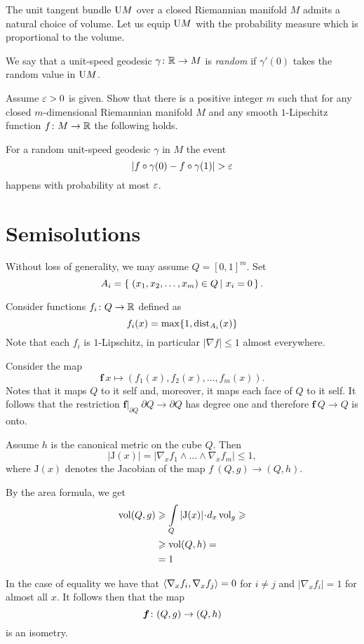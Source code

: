 The unit tangent bundle $\mathrm{U} M$ over a closed Riemannian manifold $M$
admits a natural choice of volume.
Let us equip $\mathrm{U} M$ with the probability measure which is proportional to the volume.

We say that a unit-speed geodesic $\gamma\colon\mathbb{R}\to M$ is \emph{random}
if $\gamma'(0)$ takes the random value in $\mathrm{U} M$.

\begin{pr}
Assume $\varepsilon>0$ is given.
Show that there is a positive integer $m$ such that
for any closed $m$-dimensional Riemannian manifold $M$
and any smooth $1$-Lipschitz function $f\colon M\to\mathbb{R}$ the following holds.

For a random unit-speed geodesic $\gamma$ in $M$ 
the event 
\[|f\circ\gamma(0)-f\circ\gamma(1)|>\eps\]
happens with probability at most $\varepsilon$.
\end{pr}



\section*{Semisolutions}

Without loss of generality, we may assume  $Q=[0,1]^m$.
Set 
\[A_i=\set{(x_1,x_2,\dots,x_m)\in Q}{x_i=0}.\]

Consider functions $f_i\colon Q\to\mathbb{R}$ defined as
$$f_i(x)=\max\{1,\operatorname{\rm dist}\nolimits_{A_i}(x)\}$$
Note that each $f_i$ is $1$-Lipschitz, 
in particular $|\nabla f|\le 1$ almost everywhere.

Consider the map
\[\bm{f}\:x\mapsto(f_1(x),f_2(x),\dots,f_m(x)).\]
Notes that it maps $Q$ to it self
and, moreover, it maps each face of $Q$ to it self.
It follows that the restriction $\bm{f}|_{\partial Q}\:\partial Q\to \partial Q$ has degree one and therefore 
$\bm{f}\:Q\to Q$ is onto.

Assume $h$ is the canonical metric on the cube $Q$.
Then 
\[|\mathrm{J}(x)|=|\nabla_x f_1\wedge\dots\wedge\nabla_xf_m|\le 1,\]
where $\mathrm{J}(x)$ denotes the Jacobian of the map $f\:(Q,g)\to (Q,h)$.

By the area formula, we get 
\begin{align*}
\vol(Q,g)
&\ge \int\limits_Q|\mathrm{J}(x)|\cdot d_x\vol_g\ge
\\
&\ge\vol(Q,h)=\\
&=1
\end{align*}

In the case of equality we have that $\langle\nabla_x f_i,\nabla_x f_j\rangle=0$ for $i\ne j$ 
and $|\nabla_x f_i|=1$ for almost all $x$.
It follows then that the map 
\[\bm{f}\:(Q,g)\z\to (Q,h)\] 
is an isometry.
\qeds

